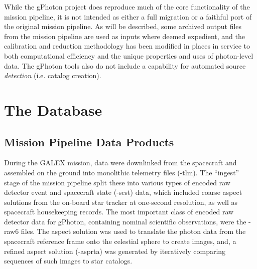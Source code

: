 \documentclass[preprint]{aastex}
\begin{document}
While the gPhoton project does reproduce much of the core functionality of the mission pipeline, it is not intended as either a full migration or a faithful port of the original mission pipeline. As will be described, some archived output files from the mission pipeline are used as inputs where deemed expedient, and the calibration and reduction methodology has been modified in places in service to both computational efficiency and the unique properties and uses of photon-level data. The gPhoton tools also do not include a capability for automated source \emph{detection} (i.e. catalog creation).

\section{The Database}
\label{database}
\subsection{Mission Pipeline Data Products}
During the GALEX mission, data were downlinked from the spacecraft and assembled on the ground into monolithic telemetry files (-tlm). The ``ingest'' stage of the mission pipeline split these into various types of encoded raw detector event and spacecraft state (-scst) data, which included coarse aspect solutions from the on-board star tracker at one-second resolution, as well as spacecraft housekeeping records. The most important class of encoded raw detector data for gPhoton, containing nominal scientific observations, were the -raw6 files. The aspect solution was used to translate the photon data from the spacecraft reference frame onto the celestial sphere to create images, and, a refined aspect solution (-asprta) was generated by iteratively comparing sequences of such images to star catalogs.
\end{document}
